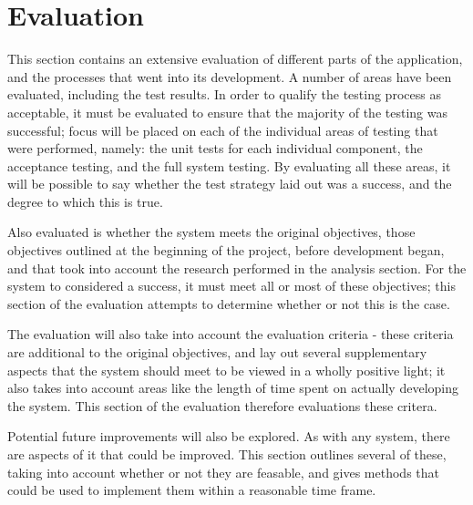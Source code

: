 \clearpage
\part{Evaluation} %
\label{prt:evaluation_}
This section contains an extensive evaluation of different parts of the application, and the processes that went into its development. A number of areas have been evaluated, including the test results. In order to qualify the testing process as acceptable, it must be evaluated to ensure that the majority of the testing was successful; focus will be placed on each of the individual areas of testing that were performed, namely: the unit tests for each individual component, the acceptance testing, and the full system testing. By evaluating all these areas, it will be possible to say whether the test strategy laid out was a success, and the degree to which this is true.

Also evaluated is whether the system meets the original objectives, those objectives outlined at the beginning of the project, before development began, and that took into account the research performed in the analysis section. For the system to considered a success, it must meet all or most of these objectives; this section of the evaluation attempts to determine whether or not this is the case.

The evaluation will also take into account the evaluation criteria - these criteria are additional to the original objectives, and lay out several supplementary aspects that the system should meet to be viewed in a wholly positive light; it also takes into account areas like the length of time spent on actually developing the system. This section of the evaluation therefore evaluations these critera.

Potential future improvements will also be explored. As with any system, there are aspects of it that could be improved. This section outlines several of these, taking into account whether or not they are feasable, and gives methods that could be used to implement them within a reasonable time frame.




